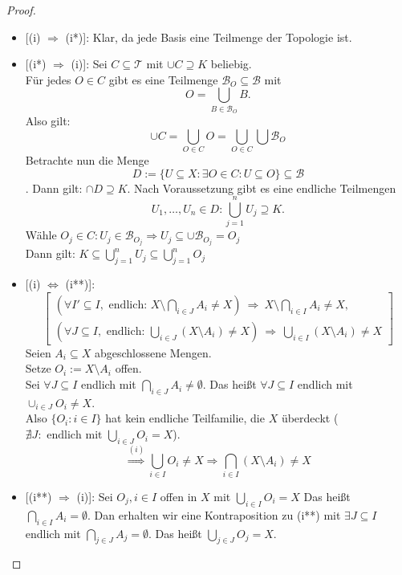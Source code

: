\begin{proof}
    \begin{itemize}
        \item{[(i) $\Rightarrow$ (i*)]}:
        Klar, da jede Basis eine Teilmenge der Topologie ist.
        \item{[(i*) $\Rightarrow$ (i)]}: 
        Sei $C \subseteq \mathcal{T}$ mit $\cup C \supseteq K$ beliebig.\\
        Für jedes $O \in C$ gibt es eine Teilmenge 
        $\mathcal{B}_O \subseteq \mathcal{B}$ mit
        $$
            O = \bigcup_{B \in \mathcal{B}_O} B .
        $$
        Also gilt: 
        $$
        \cup C = \bigcup_{O \in C} O 
        = \bigcup_{O \in C} \bigcup \mathcal{B}_O
        $$
        Betrachte nun die Menge 
        $$
        D:= \{U\subseteq X: \exists O \in C: U \subseteq O\}\subseteq \mathcal{B}
        $$.
        Dann gilt: $\cap D \supseteq K$.
        Nach Voraussetzung gibt es eine endliche Teilmengen
        $$
        U_1, \ldots, U_n \in D: \bigcup_{j=1}^n U_j \supseteq K.
        $$
        Wähle $O_j \in C : U_j \in \mathcal{B}_{O_j}
        \Rightarrow U_j \subseteq \cup \mathcal{B}_{O_j} = O_j $\\
        Dann gilt: 
        $K \subseteq \bigcup_{j=1}^n U_j \subseteq \bigcup_{j=1}^n O_j$

        \item{[(i) $\Leftrightarrow$ (i**)]}:
        $$
        \left[
        \begin{array}{l}
        (\forall I' \subseteq I, \text{ endlich: } X \setminus 
        \bigcap_{i \in J} A_i \ne X)
        \ \Rightarrow\ X \setminus \bigcap_{i \in I} A_i \ne X, \\[0.5em]
        (\forall J \subseteq I, \text{ endlich: } \bigcup_{i \in J} 
        (X \setminus A_i) \ne X)
        \ \Rightarrow\ \bigcup_{i \in I} (X \setminus A_i) \ne X
        \end{array}
        \right]
        $$
        Seien $A_i \subseteq X$ abgeschlossene Mengen.\\
        Setze $O_i := X \setminus A_i$ offen.\\
        Sei $\forall J \subseteq I$ endlich mit 
        $\bigcap_{i \in J} A_i \ne \emptyset$.
        Das heißt $\forall J \subseteq I$ endlich mit
        $ \cup_{i \in J} O_i \neq X$.\\
        Also $\{O_i:i\in I\}$ hat kein endliche Teilfamilie,
        die $X$ überdeckt ($\nexists J : \text{ endlich mit } 
        \bigcup_{i \in J} O_i = X$).
        $$
        \overset{(i)}{\Rightarrow} \bigcup_{i \in I} O_i \ne X 
        \Rightarrow \bigcap_{i \in I} (X \setminus A_i) \neq X
        $$
        \item{[(i**) $\Rightarrow$ (i)]}:
        Sei $O_j, i\in I$ offen in $X$ mit $\bigcup_{i \in I} O_i =X$ 
        Das heißt $\bigcap_{i \in I} A_i = \emptyset$.
        Dan erhalten wir eine Kontraposition zu (i**) mit
        $\exists J \subseteq I$ endlich mit
        $\bigcap_{j \in J} A_j = \emptyset$.
        Das heißt $\bigcup_{j \in J} O_j = X$.
    \end{itemize}
\end{proof}

